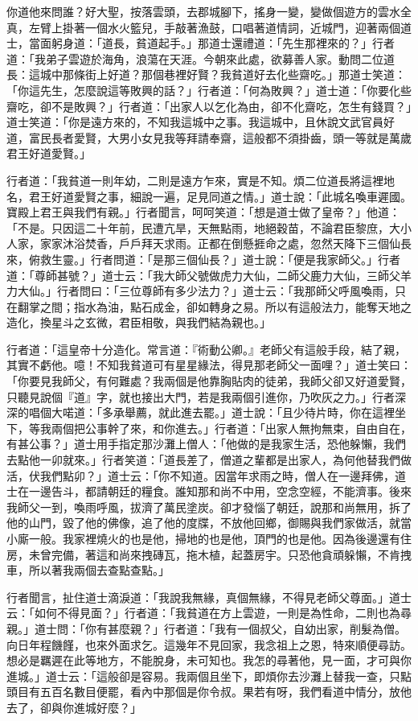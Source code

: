 你道他來問誰？好大聖，按落雲頭，去郡城腳下，搖身一變，變做個遊方的雲水全真，左臂上掛著一個水火籃兒，手敲著漁鼓，口唱著道情詞，近城門，迎著兩個道士，當面躬身道：「道長，貧道起手。」那道士還禮道：「先生那裡來的？」行者道：「我弟子雲遊於海角，浪蕩在天涯。今朝來此處，欲募善人家。動問二位道長：這城中那條街上好道？那個巷裡好賢？我貧道好去化些齋吃。」那道士笑道：「你這先生，怎麼說這等敗興的話？」行者道：「何為敗興？」道士道：「你要化些齋吃，卻不是敗興？」行者道：「出家人以乞化為由，卻不化齋吃，怎生有錢買？」道士笑道：「你是遠方來的，不知我這城中之事。我這城中，且休說文武官員好道，富民長者愛賢，大男小女見我等拜請奉齋，這般都不須掛齒，頭一等就是萬歲君王好道愛賢。」

行者道：「我貧道一則年幼，二則是遠方乍來，實是不知。煩二位道長將這裡地名，君王好道愛賢之事，細說一遍，足見同道之情。」道士說：「此城名喚車遲國。寶殿上君王與我們有親。」行者聞言，呵呵笑道：「想是道士做了皇帝？」他道：「不是。只因這二十年前，民遭亢旱，天無點雨，地絕穀苗，不論君臣黎庶，大小人家，家家沐浴焚香，戶戶拜天求雨。正都在倒懸捱命之處，忽然天降下三個仙長來，俯救生靈。」行者問道：「是那三個仙長？」道士說：「便是我家師父。」行者道：「尊師甚號？」道士云：「我大師父號做虎力大仙，二師父鹿力大仙，三師父羊力大仙。」行者問曰：「三位尊師有多少法力？」道士云：「我那師父呼風喚雨，只在翻掌之間；指水為油，點石成金，卻如轉身之易。所以有這般法力，能奪天地之造化，換星斗之玄微，君臣相敬，與我們結為親也。」

行者道：「這皇帝十分造化。常言道：『術動公卿。』老師父有這般手段，結了親，其實不虧他。噫！不知我貧道可有星星緣法，得見那老師父一面哩？」道士笑曰：「你要見我師父，有何難處？我兩個是他靠胸貼肉的徒弟，我師父卻又好道愛賢，只聽見說個『道』字，就也接出大門，若是我兩個引進你，乃吹灰之力。」行者深深的唱個大喏道：「多承舉薦，就此進去罷。」道士說：「且少待片時，你在這裡坐下，等我兩個把公事幹了來，和你進去。」行者道：「出家人無拘無束，自由自在，有甚公事？」道士用手指定那沙灘上僧人：「他做的是我家生活，恐他躲懶，我們去點他一卯就來。」行者笑道：「道長差了，僧道之輩都是出家人，為何他替我們做活，伏我們點卯？」道士云：「你不知道。因當年求雨之時，僧人在一邊拜佛，道士在一邊告斗，都請朝廷的糧食。誰知那和尚不中用，空念空經，不能濟事。後來我師父一到，喚雨呼風，拔濟了萬民塗炭。卻才發惱了朝廷，說那和尚無用，拆了他的山門，毀了他的佛像，追了他的度牒，不放他回鄉，御賜與我們家做活，就當小廝一般。我家裡燒火的也是他，掃地的也是他，頂門的也是他。因為後邊還有住房，未曾完備，著這和尚來拽磚瓦，拖木植，起蓋房宇。只恐他貪頑躲懶，不肯拽車，所以著我兩個去查點查點。」

行者聞言，扯住道士滴淚道：「我說我無緣，真個無緣，不得見老師父尊面。」道士云：「如何不得見面？」行者道：「我貧道在方上雲遊，一則是為性命，二則也為尋親。」道士問：「你有甚麼親？」行者道：「我有一個叔父，自幼出家，削髮為僧。向日年程饑饉，也來外面求乞。這幾年不見回家，我念祖上之恩，特來順便尋訪。想必是羈遲在此等地方，不能脫身，未可知也。我怎的尋著他，見一面，才可與你進城。」道士云：「這般卻是容易。我兩個且坐下，即煩你去沙灘上替我一查，只點頭目有五百名數目便罷，看內中那個是你令叔。果若有呀，我們看道中情分，放他去了，卻與你進城好麼？」

